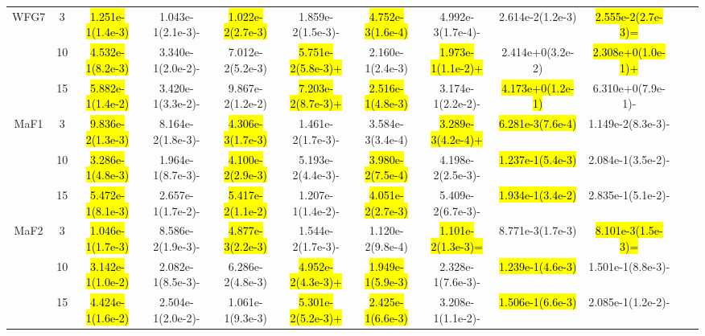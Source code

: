 \documentclass[a4paper,fleqn]{cas-dc}
\newcommand{\highlight}[1]{
	\begingroup
	\sethlcolor{Seashell}%
	\hl{#1}%
	\endgroup
}
\begin{document}
\begin{sloppypar}
\begin{table}[ht]
{\begin{tabular}{cccccccccccc}
				
				\multirow{3}{*}{WFG7}&3 	&\highlight{1.251e-1(1.4e-3)}	&1.043e-1(2.1e-3)-	&\highlight{1.022e-2(2.7e-3)}	&1.859e-2(1.5e-3)-	&\highlight{4.752e-3(1.6e-4)}	&4.992e-3(1.7e-4)-	&2.614e-2(1.2e-3)	&\highlight{2.555e-2(2.7e-3)=}\\
				\multirow{3}{*}{~}&10   &\highlight{4.532e-1(8.2e-3)}	&3.340e-1(2.0e-2)-	&7.012e-2(5.2e-3)	&\highlight{5.751e-2(5.8e-3)+}	&2.160e-1(2.4e-3)	&\highlight{1.973e-1(1.1e-2)+}	&2.414e+0(3.2e-2)	&\highlight{2.308e+0(1.0e-1)+}\\
				\multirow{3}{*}{~}&15    	&\highlight{5.882e-1(1.4e-2)}	&3.420e-1(3.3e-2)-	&9.867e-2(1.2e-2)	&\highlight{7.203e-2(8.7e-3)+}	&\highlight{2.516e-1(4.8e-3)}	&3.174e-1(2.2e-2)-	&\highlight{4.173e+0(1.2e-1)}	&6.310e+0(7.9e-1)-\\
				\hline
				
				
				\multirow{3}{*}{MaF1}&3		&\highlight{9.836e-2(1.3e-3)}	&8.164e-2(1.8e-3)-	&\highlight{4.306e-3(1.7e-3)}	&{1.461e-2(1.7e-3)-}	&3.584e-3(3.4e-4)	&\highlight{3.289e-3(4.2e-4)+}	&\highlight{6.281e-3(7.6e-4)}	&1.149e-2(8.3e-3)-\\
				\multirow{3}{*}{~}&10 	&\highlight{3.286e-1(4.8e-3)}	&1.964e-1(8.7e-3)-	&\highlight{4.100e-2(2.9e-3)}	&5.193e-2(4.4e-3)-	&\highlight{3.980e-2(7.5e-4)}	&4.198e-2(2.5e-3)-	&\highlight{1.237e-1(5.4e-3)}	&2.084e-1(3.5e-2)-\\
				\multirow{3}{*}{~}&15		&\highlight{5.472e-1(8.1e-3)}	&2.657e-1(1.7e-2)-	&\highlight{5.417e-2(1.1e-2)}	&1.207e-1(1.4e-2)-	&\highlight{4.051e-2(2.7e-3)}	&5.409e-2(6.7e-3)-	&\highlight{1.934e-1(3.4e-2)}	&2.835e-1(5.1e-2)-\\
				\hline
				
				
				
				
				
				\multirow{3}{*}{MaF2}&3 	&\highlight{1.046e-1(1.7e-3)}	&8.586e-2(1.9e-3)-	&\highlight{4.877e-3(2.2e-3)}	&1.544e-2(1.7e-3)-	&1.120e-2(9.8e-4)	&\highlight{1.101e-2(1.3e-3)=}	&8.771e-3(1.7e-3)	&\highlight{8.101e-3(1.5e-3)=}\\
				\multirow{3}{*}{~}&10 		&\highlight{3.142e-1(1.0e-2)}	&2.082e-1(8.5e-3)-	&6.286e-2(4.8e-3)	&\highlight{4.952e-2(4.3e-3)+}	&\highlight{1.949e-1(5.9e-3)}	&2.328e-1(7.6e-3)-	&\highlight{1.239e-1(4.6e-3)}	&1.501e-1(8.8e-3)-\\
				\multirow{3}{*}{~}&15 	&\highlight{4.424e-1(1.6e-2)}	&2.504e-1(2.0e-2)-	&1.061e-1(9.3e-3)	&\highlight{5.301e-2(5.2e-3)+}	&\highlight{2.425e-1(6.6e-3)}	&3.208e-1(1.1e-2)-	&\highlight{1.506e-1(6.6e-3)}	&2.085e-1(1.2e-2)-\\
				\hline
				

\end{tabular}}
\end{table}
\end{sloppypar}
\end{document}
